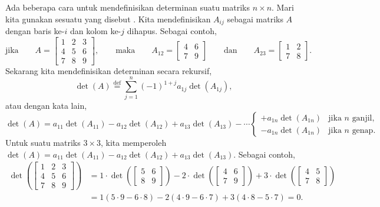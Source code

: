 Ada beberapa cara untuk mendefinisikan determinan suatu matriks $n \times n$.
Mari kita gunakan sesuatu yang disebut \emph{}.
Kita mendefinisikan $A_{ij}$ sebagai
matriks $A$ dengan baris ke-$i$ dan kolom ke-$j$
dihapus. Sebagai contoh,
\begin{equation*}
\text{jika} \qquad
A =
\begin{bmatrix}
1 & 2 & 3 \\
4 & 5 & 6 \\
7 & 8 & 9
\end{bmatrix} ,
\qquad
\text{maka}
\qquad
A_{12} =
\begin{bmatrix}
4 & 6 \\
7 & 9
\end{bmatrix}
\qquad
\text{dan}
\qquad
A_{23} =
\begin{bmatrix}
1 & 2 \\
7 & 8
\end{bmatrix} .
\end{equation*}
Sekarang kita mendefinisikan determinan secara rekursif,
\begin{equation*}
\det (A)
\overset{\text{def}}{=}
\sum_{j=1}^n
{(-1)}^{1+j}
a_{1j} \det (A_{1j}) ,
\end{equation*}
atau dengan kata lain,
\begin{equation*}
\det (A) =
a_{11} \det (A_{11}) -
a_{12} \det (A_{12}) +
a_{13} \det (A_{13}) -
\cdots
\begin{cases}
+ a_{1n} \det (A_{1n}) & \text{jika } n \text{ ganjil,} \\
- a_{1n} \det (A_{1n}) & \text{jika } n \text{ genap.}
\end{cases}
\end{equation*}
Untuk suatu matriks $3 \times 3$,
kita memperoleh $\det (A) = a_{11} \det (A_{11}) -
a_{12} \det (A_{12}) + a_{13} \det (A_{13})$. Sebagai contoh,
\begin{equation*}
\begin{split}
\det \left(
\begin{bmatrix}
1 & 2 & 3 \\
4 & 5 & 6 \\
7 & 8 & 9
\end{bmatrix}
\right)
& =
1 \cdot
\det \left(
\begin{bmatrix}
5 & 6 \\
8 & 9
\end{bmatrix}
\right)
-
2 \cdot
\det \left(
\begin{bmatrix}
4 & 6 \\
7 & 9
\end{bmatrix}
\right)
+
3 \cdot
\det \left(
\begin{bmatrix}
4 & 5 \\
7 & 8
\end{bmatrix}
\right) \\
& =
1 (5 \cdot 9 - 6 \cdot 8)
-
2 (4 \cdot 9 - 6 \cdot 7)
+
3 (4 \cdot 8 - 5 \cdot 7)
= 0 .
\end{split}
\end{equation*}

